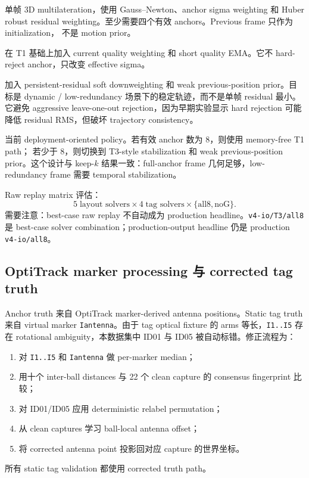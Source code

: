 \documentclass[11pt,a4paper]{article}
\begin{document}
\begin{description}[leftmargin=2.6em,style=nextline]
  \item[\texttt{T1}: robust WLS multilateration.]
  单帧 3D multilateration，使用 Gauss--Newton、anchor sigma weighting 和 Huber robust
  residual weighting。至少需要四个有效 anchors。Previous frame 只作为 initialization，
  不是 motion prior。

  \item[\texttt{T2}: quality-aware robust WLS.]
  在 T1 基础上加入 current quality weighting 和 short quality EMA。它不 hard-reject
  anchor，只改变 effective sigma。

  \item[\texttt{T3}: dynamic-stable robust WLS.]
  加入 persistent-residual soft downweighting 和 weak previous-position prior。目标是
  dynamic / low-redundancy 场景下的稳定轨迹，而不是单帧 residual 最小。它避免 aggressive
  leave-one-out rejection，因为早期实验显示 hard rejection 可能降低 residual RMS，但破坏
  trajectory consistency。

  \item[\texttt{T4}: adaptive redundancy policy.]
  当前 deployment-oriented policy。若有效 anchor 数为 8，则使用 memory-free T1 path；
  若少于 8，则切换到 T3-style stabilization 和 weak previous-position prior。这个设计与
  keep-$k$ 结果一致：full-anchor frame 几何足够，low-redundancy frame 需要 temporal
  stabilization。
\end{description}

Raw replay matrix 评估：
\[
  5\;\text{layout solvers}\times4\;\text{tag solvers}\times\{\text{all8},\text{noG}\}.
\]
需要注意：best-case raw replay 不自动成为 production headline。\texttt{v4-io/T3/all8}
是 best-case solver combination；production-output headline 仍是 production \texttt{v4-io/all8}。

\subsection{OptiTrack marker processing 与 corrected tag truth}
Anchor truth 来自 OptiTrack marker-derived antenna positions。Static tag truth 来自
virtual marker \texttt{Iantenna}。由于 tag optical fixture 的 arms 等长，\texttt{I1..I5}
存在 rotational ambiguity，本数据集中 ID01 与 ID05 被自动标错。修正流程为：
\begin{enumerate}[leftmargin=1.6em]
  \item 对 \texttt{I1..I5} 和 \texttt{Iantenna} 做 per-marker median；
  \item 用十个 inter-ball distances 与 22 个 clean capture 的 consensus fingerprint 比较；
  \item 对 ID01/ID05 应用 deterministic relabel permutation；
  \item 从 clean captures 学习 ball-local antenna offset；
  \item 将 corrected antenna point 投影回对应 capture 的世界坐标。
\end{enumerate}
所有 static tag validation 都使用 corrected truth path。
\end{document}
